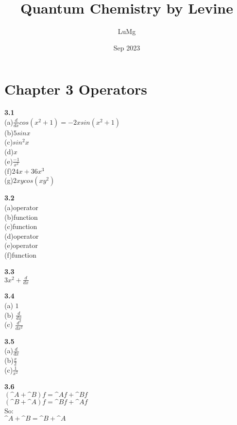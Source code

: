 \documentclass{article}
\title{Quantum Chemistry by Levine}
\author{LuMg}
\date{Sep 2023}
\begin{document}
\maketitle

\section{Chapter 3 Operators}
\textbf{3.1}\\
(a)$\frac{d}{dx}cos(x^2+1) = -2xsin(x^2+1)$\\
(b)$5sinx$\\
(c)$sin^2x$\\
(d)$x$\\
(e)$\frac{-1}{x^2}$\\
(f)$24x+36x^3$\\
(g)$2xycos(xy^2)$\\
\newline

\textbf{3.2}\\
(a)operator\\
(b)function\\
(c)function\\
(d)operator\\
(e)operator\\
(f)function\\
\newline

\textbf{3.3}\\
$3x^2+\frac{d}{dx}$\\
\newline

\textbf{3.4}\\
(a) $1$\\
(b) $\frac{d}{dx}$\\
(c) $\frac{d^2}{dx^2}$\\
\newline

\textbf{3.5}\\
(a)$\frac{d}{dx}$\\
(b)$\frac{x}{2}$\\
(c)$\frac{1}{x^2}$\\
\newline

\textbf{3.6}\\
$(\^{A}+\^{B})f = \^{A}f + \^{B}f$\\
$(\^{B}+\^{A})f = \^{B}f + \^{A}f$\\
So:\\
$\^{A}+\^{B} = \^{B}+\^{A}$\\
\newline
\end{document}
